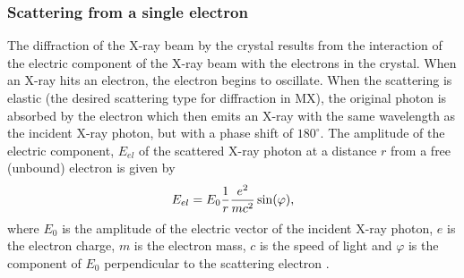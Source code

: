         \subsubsection{Scattering from a single electron}
        \label{subs:Scattering from single electron}
            The diffraction of the X-ray beam by the crystal results from the interaction of the electric component of the X-ray beam with the electrons in the crystal.
            When an X-ray hits an electron, the electron begins to oscillate.
            When the scattering is elastic (the desired scattering type for diffraction in MX), the original photon is absorbed by the electron which then emits an X-ray with the same wavelength as the incident X-ray photon, but with a phase shift of $180^{\circ}$.
            The amplitude of the electric component, $E_{el}$ of the scattered X-ray photon at a distance $r$ from a free (unbound) electron is given by
            \begin{equation}
                E_{el} = E_0 \frac{1}{r}\frac{e^2}{mc^2} \sin(\varphi),
            \end{equation}
            where $E_0$ is the amplitude of the electric vector of the incident X-ray photon, $e$ is the electron charge, $m$ is the electron mass, $c$ is the speed of light and $\varphi$ is the component of $E_0$ perpendicular to the scattering electron \cite{drenth2012}.

